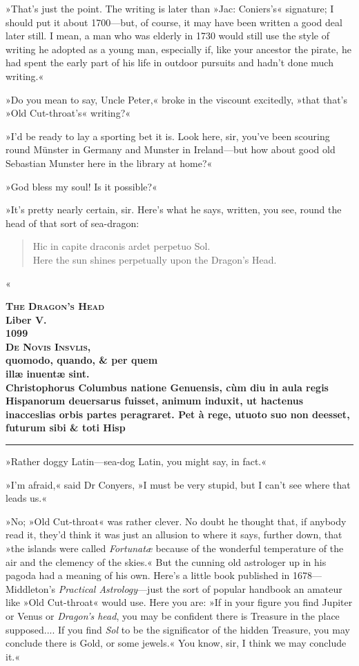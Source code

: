 »That's just the point. The writing is later than »Jac: Coniers's« signature; I should put it about 1700—but, of course, it may have been written a good deal later still. I mean, a man who was elderly in 1730 would still use the style of writing he adopted as a young man, especially if, like your ancestor the pirate, he had spent the early part of his life in outdoor pursuits and hadn't done much writing.«

»Do you mean to say, Uncle Peter,« broke in the viscount excitedly, »that that's »Old Cut-throat's« writing?«

»I'd be ready to lay a sporting bet it is. Look here, sir, you've been scouring round Münster in Germany and Munster in Ireland—but how about good old Sebastian Munster here in the library at home?«

»God bless my soul! Is it possible?«

»It's pretty nearly certain, sir. Here's what he says, written, you see, round the head of that sort of sea-dragon:
\begin{quote}
Hic in capite draconis ardet perpetuo Sol.\\
Here the sun shines perpetually upon the Dragon's Head.
\end{quote}«

\begin{center}\bfseries
\textsc{The Dragon's Head}\\
Liber V.\\
1099\\
\textsc{De Novis Insvlis,}\\
quomodo, quando, \& per quem\\
illæ inuentæ sint.\\
Christophorus Columbus natione Genuensis, cùm diu in aula regis Hispanorum deuersarus fuisset, animum induxit, ut hactenus inacceslias orbis partes peragraret. Pet à rege, utuoto suo non deesset, futurum sibi \& toti Hisp
\end{center}

\noindent\hfil\rule{0.5\textwidth}{.4pt}\hfil 

»Rather doggy Latin—sea-dog Latin, you might say, in fact.«

»I'm afraid,« said Dr Conyers, »I must be very stupid, but I can't see where that leads us.«

»No; »Old Cut-throat« was rather clever. No doubt he thought that, if anybody read it, they'd think it was just an allusion to where it says, further down, that »the islands were called \textit{Fortunatæ} because of the wonderful temperature of the air and the clemency of the skies.« But the cunning old astrologer up in his pagoda had a meaning of his own. Here's a little book published in 1678—Middleton's \textit{Practical Astrology}—just the sort of popular handbook an amateur like »Old Cut-throat« would use. Here you are: »If in your figure you find Jupiter or Venus or \textit{Dragon's head}, you may be confident there is Treasure in the place supposed.... If you find \textit{Sol} to be the significator of the hidden Treasure, you may conclude there is Gold, or some jewels.« You know, sir, I think we may conclude it.«

